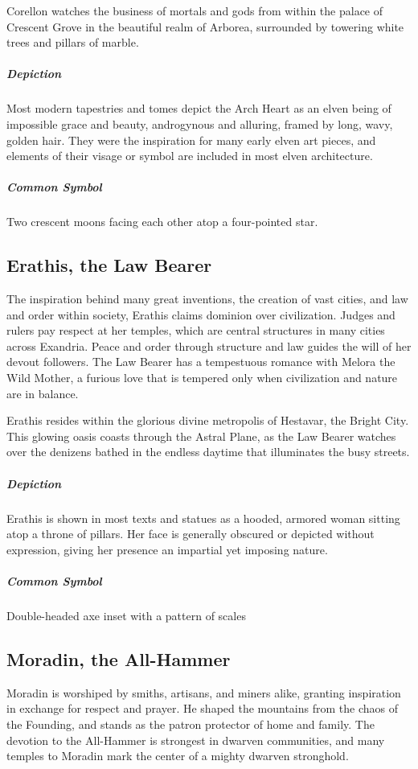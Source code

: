 \documentclass[letterpaper,twocolumn,openany,nodeprecatedcode]{dndbook}
\begin{document}
Corellon watches the business of mortals and gods from within the palace of Crescent
Grove in the beautiful realm of Arborea, surrounded by towering white trees and
pillars of marble.

\subparagraph{Depiction}
Most modern tapestries and tomes depict the Arch Heart as an elven being of impossible
grace and beauty, androgynous and alluring, framed by long, wavy, golden hair. They were
the inspiration for many early elven art pieces, and elements of their visage or symbol
are included in most elven architecture.

\subparagraph{Common Symbol}
Two crescent moons facing each other atop a four-pointed star.

\subsection{Erathis, the Law Bearer}

The inspiration behind many great inventions, the creation of vast cities, and law and
order within society, Erathis claims dominion over civilization. Judges and rulers pay
respect at her temples, which are central structures in many cities across Exandria.
Peace and order through structure and law guides the will of her devout followers.
The Law Bearer has a tempestuous romance with Melora the Wild Mother, a furious love
that is tempered only when civilization and nature are in balance.

Erathis resides within the glorious divine metropolis of Hestavar, the Bright City.
This glowing oasis coasts through the Astral Plane, as the Law Bearer watches over the
denizens bathed in the endless daytime that illuminates the busy streets.

\subparagraph{Depiction}
Erathis is shown in most texts and statues as a hooded, armored woman sitting atop a
throne of pillars. Her face is generally obscured or depicted without expression,
giving her presence an impartial yet imposing nature.

\subparagraph{Common Symbol}
Double-headed axe inset with a pattern of scales

\subsection{Moradin, the All-Hammer}

Moradin is worshiped by smiths, artisans, and miners alike, granting inspiration in
exchange for respect and prayer. He shaped the mountains from the chaos of the Founding,
and stands as the patron protector of home and family. The devotion to the All-Hammer is
strongest in dwarven communities, and many temples to Moradin mark the center of a mighty
dwarven stronghold.
\end{document}
